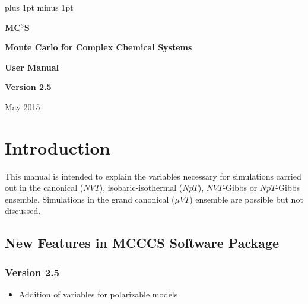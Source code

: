 \documentclass[12pt,letterpaper]{article}
\begin{document}
\parskip=6pt plus 1pt minus 1pt


\centerline{\bf \Huge MC$^3$S}

\vskip 24pt

\centerline{\bf \LARGE Monte Carlo for Complex Chemical Systems}

\vskip 24pt

\centerline{\bf \Large User Manual}

\vskip 24pt

\centerline{\bf \Large Version 2.5}

\vskip 36pt

\centerline{\large May 2015}

\eject

%
%
%
\section{Introduction}
This manual is intended to explain the variables necessary
for simulations carried out in the canonical ($NVT$),
isobaric-isothermal ($NpT$), $NVT$-Gibbs or $NpT$-Gibbs
ensemble. Simulations in the grand canonical ($\mu VT$)
ensemble are possible but not discussed.

\subsection{New Features in MCCCS Software Package}
\subsubsection{Version 2.5}
\begin{itemize}
\item Addition of variables for polarizable models
\end{itemize}
\end{document}
